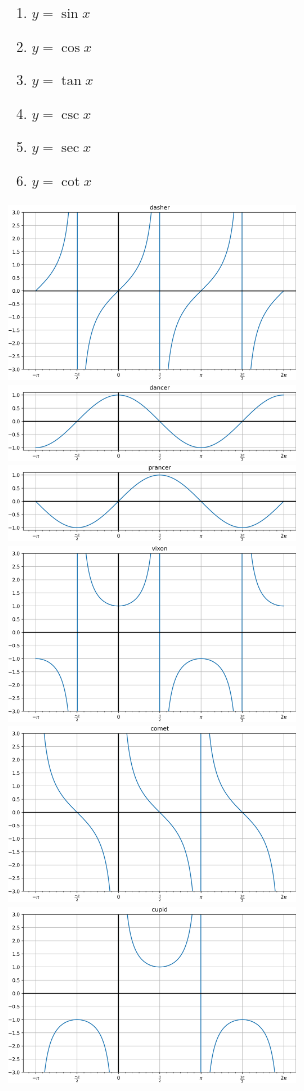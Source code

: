 \documentclass{article}
\begin{document}
\begin{multicols}{2}
\begin{enumerate}
	\item $y=\sin x$
	\item $y=\cos x$
	\item $y=\tan x$
	\item $y=\csc x$
	\item $y=\sec x$
	\item $y=\cot x$
\end{enumerate}

\noindent
\includegraphics[width=3in]{dasher.png} \\
\includegraphics[width=3in]{dancer.png} \\
\includegraphics[width=3in]{prancer.png} \\
\includegraphics[width=3in]{vixon.png} \\
\includegraphics[width=3in]{comet.png} \\
\includegraphics[width=3in]{cupid.png}
\end{multicols}
\end{document}
